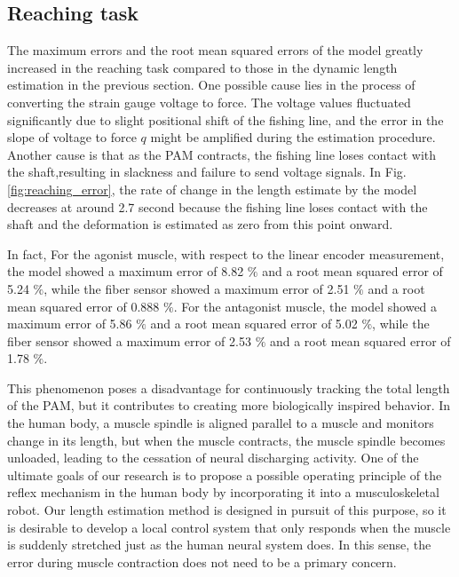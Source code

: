 \subsection{Reaching task}
The maximum errors and the root mean squared errors of the model greatly increased in the reaching task compared to those in the dynamic length estimation in the previous section. One possible cause lies in the process of converting the strain gauge voltage to force. The voltage values fluctuated significantly due to slight positional shift of the fishing line, and the error in the slope of voltage to force $q$ might be amplified during the estimation procedure. Another cause is that as the PAM contracts, the fishing line loses contact with the shaft,resulting in slackness and failure to send voltage signals. In Fig.\ref{fig:reaching_error}, the rate of change in the length estimate by the model decreases at around 2.7 second because the fishing line loses contact with the shaft and the deformation is estimated as zero from this point onward.

In fact,
For the agonist muscle, with respect to the linear encoder measurement, the model showed a maximum error of 8.82 $\%$ and a root mean squared error of 5.24 $\%$, while the fiber sensor showed a maximum error of 2.51 $\%$ and a root mean squared error of 0.888 $\%$. For the antagonist muscle, the model showed a maximum error of 5.86 $\%$ and a root mean squared error of 5.02 $\%$, while the fiber sensor showed a maximum error of 2.53 $\%$ and a root mean squared error of 1.78 $\%$. 

This phenomenon poses a disadvantage for continuously tracking the total length of the PAM, but it contributes to creating more biologically inspired behavior. In the human body, a muscle spindle is aligned parallel to a muscle and monitors change in its length, but when the muscle contracts, the muscle spindle becomes unloaded, leading to the cessation of neural discharging activity\cite{spindle}. One of the ultimate goals of our research is to propose a possible operating principle of the reflex mechanism in the human body by incorporating it into a musculoskeletal robot. Our length estimation method is designed in pursuit of this purpose, so it is desirable to develop a local control system that only responds when the muscle is suddenly stretched just as the human neural system does. In this sense, the error during muscle contraction does not need to be a primary concern.


